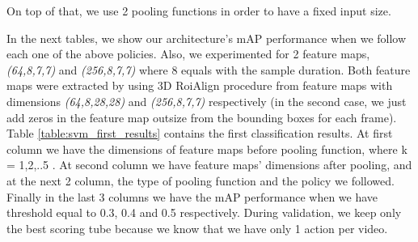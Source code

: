 On top of that, we use 2 pooling functions in order to have a fixed input size. \par
In the next tables, we show our architecture's  mAP performance when we follow each one of the above policies. Also,
we experimented for 2 feature maps, \textit{(64,8,7,7)} and \textit{(256,8,7,7)} where 8 equals with the sample duration.
Both feature maps were extracted by using 3D RoiAlign procedure from feature maps with dimensions \textit{(64,8,28,28)} and
\textit{(256,8,7,7)} respectively (in the second case, we just add zeros in the feature map outsize from the bounding boxes for
each frame). Table \ref{table:svm_first_results} contains the first classification results. At first column we have the dimensions
of feature maps before pooling function, where k = 1,2,..5 . At second column we have feature maps' dimensions after pooling, and at
the next 2 column, the type of pooling function and the policy we followed. Finally in the last 3 columns we have the mAP performance
when we have threshold equal to 0.3, 0.4 and 0.5 respectively. During validation, we keep only the best scoring tube because we know that
we have only 1 action per video.

